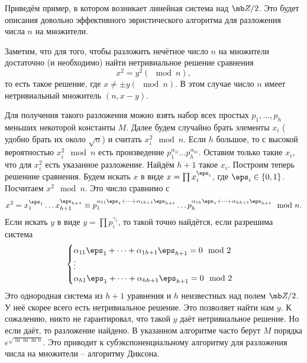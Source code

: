 Приведём пример, в котором возникает линейная система над $\mb Z/2$. Это будет описания довольно эффективного эвристического алгоритма для разложения числа $n$ на множители. 

Заметим, что для того, чтобы разложить нечётное число $n$ на множители достаточно (и необходимо) найти нетривиальное решение сравнения $$x^2=y^2(\mod n),$$
то есть такое решение, где $x\neq \pm y (\mod n)$. В этом случае число $n$ имеет нетривиальный множитель $(n,x-y)$.

Для получения такого разложения можно взять набор всех простых $p_1,\dots,p_h$ меньших некоторой константы $M$. Далее будем случайно брать элементы $x_i$ ( удобно брать их около $\sqrt{n}$) и считать  $x_i^2 \mod n$. Если $h$ большое, то с высокой вероятностью $x_i^2\mod  n$ есть произведение $p_1^{\alpha_{1i}}\dots p_h^{\alpha_{hi}}$. Оставим только такие $x_i$, что для $x_i^2$ есть указанное разложение. Найдём $h+1$ такое $x_i$. Построим теперь решениие сравнения. Будем искать $x$ в виде $x=\prod x_i^{\eps_i}$, где $\eps_i \in \{0,1\}$. Посчитаем $x^2 \mod n$. Это число сравнимо с 
$$x^2 =x_1^{\eps_1}\dots x_{h+1}^{\eps_{h+1}} \equiv p_1^{\alpha_{11}\eps_1 +\dots+\alpha_{1h+1}\eps_{h+1}} \dots p_h^{\alpha_{1h}\eps_1 +\dots+\alpha_{h h+1}\eps_{h+1}} \mod n.$$
Если искать $y$ в виде $y=\prod p_i^{\gamma_i}$, то такой точно найдётся, если разрешима система
$$\begin{cases}
\alpha_{11} \eps_1+\dots+\alpha_{1h+1}\eps_{h+1}=0 \mod 2 \\
\vdots\\
\alpha_{h1} \eps_1+\dots+\alpha_{hh+1}\eps_{h+1}=0 \mod 2
\end{cases}$$
Это однородная система из $h+1$ уравнения и $h$ неизвестных над полем $\mb Z/2$. У неё скорее всего есть нетривиальное решение. Это позволяет найти нам $y$. К сожалению, никто не гарантировал, что такой $y$ даёт нетривиальное решение. Но если даёт, то разложение найдено. В указанном алгоритме часто берут $M$ порядка $e^{\sqrt{\ln \ln\ln n}}$. Это приводит к субэкспоненциальному алгоритму для разложения числа на множители -- алгоритму Диксона.

